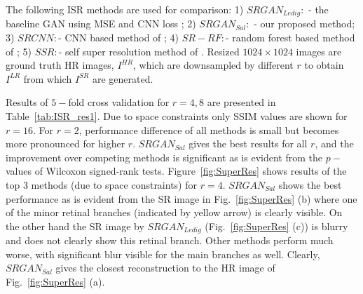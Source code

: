 \documentclass{llncs}
\begin{document}
The following ISR methods are used for comparison: 1) $SRGAN_{Ledig}:$ - the baseline GAN using MSE and CNN loss \cite{Srgan}; 2) $SRGAN_{Sal}:$ - our proposed method;
 3) $SRCNN:$- CNN based method of \cite{SRCNN}; 
 4) $SR-RF:$- random forest based method of \cite{SR-RF};
 5) $SSR:$- self super resolution method of \cite{Jog}.
Resized $1024\times1024$ images are ground truth HR images, $I^{HR}$, which  are downsampled by different $r$ to obtain $I^{LR}$ from which $I^{SR}$ are generated. %


Results of $5-$fold cross validation for $r=4,8$ are presented in Table~\ref{tab:ISR_res1}. Due to space constraints only SSIM values are shown for $r=16$.
For $r=2$, performance difference of all methods is small but becomes more pronounced for higher $r$. $SRGAN_{Sal}$ gives the best results for all $r$, and the improvement over competing methods is significant as is evident from the $p-$values of Wilcoxon signed-rank tests. %
Figure~\ref{fig:SuperRes} shows results of the top $3$ methods (due to space constraints) for $r=4$. $SRGAN_{Sal}$ shows the best performance as is evident from the SR image in  Fig.~\ref{fig:SuperRes} (b) where one of the minor retinal branches (indicated by yellow arrow) is clearly visible. On the other hand the SR image by $SRGAN_{Ledig}$ (Fig.~\ref{fig:SuperRes} (c)) is blurry and does not clearly show this retinal branch. Other methods perform much worse, with significant blur visible for the main branches as well. Clearly, $SRGAN_{Sal}$ gives the closest reconstruction to the HR image of Fig.~\ref{fig:SuperRes} (a).
\end{document}
